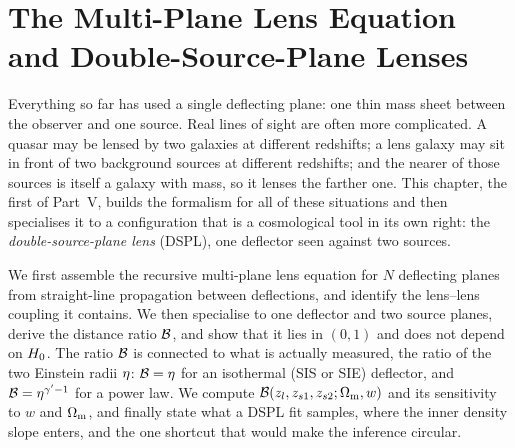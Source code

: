 
\chapter{The Multi-Plane Lens Equation and Double-Source-Plane Lenses}
\label{ch:multiplane_dspl}

\noindent
Everything so far has used a single deflecting plane: one thin mass
sheet between the observer and one source.  Real lines of sight are
often more complicated.  A quasar may be lensed by two galaxies at
different redshifts; a lens galaxy may sit in front of two background
sources at different redshifts; and the nearer of those sources is itself
a galaxy with mass, so it lenses the farther one.  This chapter, the
first of Part~V, builds the formalism for all of these situations and
then specialises it to a configuration that is a cosmological tool in its
own right: the \emph{double-source-plane lens} (DSPL), one deflector
seen against two sources.

We first assemble the recursive multi-plane lens equation for
$N$ deflecting planes from straight-line propagation between
deflections, and identify the lens--lens coupling it contains.  We then
specialise to one deflector and two source planes, derive the
distance ratio $\mathcal{B}$, and show that it lies in $(0,1)$
and does not depend on $H_0$.  The ratio $\mathcal{B}$ is connected to what
is actually measured, the ratio of the two Einstein radii $\eta$:
$\mathcal{B}=\eta$ for an isothermal (SIS or SIE) deflector, and
$\mathcal{B}=\eta^{\gamma'-1}$ for a power law.  We compute
$\mathcal{B}(z_l,z_{s1},z_{s2};\Omega_{\mathrm{m}},w)$ and its sensitivity to $w$ and
$\Omega_{\mathrm{m}}$, and finally state what a DSPL fit samples, where the inner
density slope enters, and the one shortcut that would make the
inference circular.

